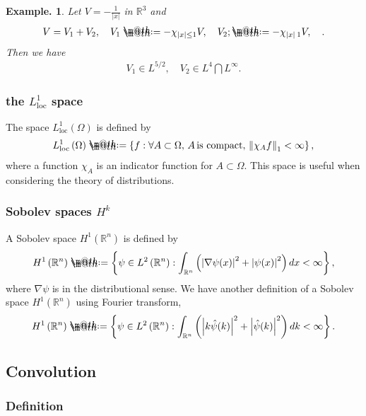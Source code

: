 \documentclass[openany, a4paper, oneside]{book}
\makeatletter
\newcommand*{\defeq}{\mathrel{\rlap{%
\raisebox{0.3ex}{$\m@th\cdot$}}%
\raisebox{-0.3ex}{$\m@th\cdot$}}%
=}
\theoremstyle{break}
\theoremstyle{breakdefn}
\newtheorem{ex}[thm]{Example.}
\newcommand{\abs}[1]{\left|#1\right|}
\newcommand{\norm}[1]{\left\Vert#1\right\Vert}
\newcommand{\rbk}[1]{\left (#1\right)}
\newcommand{\set}[2]{\left\{#1 : #2\right\}}
\newcommand{\bbR}{\mathbb{R}}
\newcommand{\bbRthree}{\mathbb{R}^3}
\newcommand{\bbRn}{\mathbb{R}^n}
\newcommand{\Loneloc}{L_{\mathrm{loc}}^1}
\newcommand{\LtwoRn}{L^2 \rbk{\bbR^n}}
\makeatother
\begin{document}
\begin{ex}
 Let $V = - \frac{1}{\abs{x}}$ in $\bbRthree$ and
 \begin{align}
  V = V_1 + V_2, \quad
  V_1
  \defeq
  -\chi_{\abs{x} \leq 1} V, \quad
  V_2;
  \defeq
  -\chi_{\abs{x} \> 1} V, \quad.
 \end{align}
 Then we have
 \begin{align}
  V_1 \in L^{5/2}, \quad
  V_2 \in L^{4} \bigcap L^{\infty}.
 \end{align}
\end{ex}
\subsubsection{the $\Loneloc$ space}
\label{sec-7-10-2-2-3}

The space $\Loneloc \rbk{\Omega}$ is defined by
\begin{align}
 \Loneloc \rbk{\Omega}
 \defeq
 \set{f}{\forall A \subset \Omega, \, A \, \text{is compact}, \, \norm{\chi_A f}_1 < \infty},
\end{align}
where a function $\chi_A$ is an indicator function for $A \subset \Omega$.
This space is useful when considering the theory of distributions.
\subsubsection{Sobolev spaces $H^k$}
\label{sec-7-10-2-2-4}

A Sobolev space $H^1 (\bbRn)$ is defined by
\begin{align}
 H^1 \rbk{\bbRn}
 \defeq
 \set{\psi \in \LtwoRn}{\int_{\bbRn} \rbk{\abs{\nabla \psi (x)}^2 + \abs{\psi (x)}^2} dx < \infty},
\end{align}
where $\nabla \psi$ is in the distributional sense.
We have another definition of a Sobolev space $H^1 (\bbRn)$ using Fourier transform,
\begin{align}
 H^1 \rbk{\bbRn}
 \defeq
 \set{\psi \in \LtwoRn}{\int_{\bbRn} \rbk{\abs{k \hat{\psi} (k)}^2 + \abs{\hat{\psi} (k)}^2} dk < \infty}.
\end{align}
\subsection{Convolution}
\label{sec-7-10-2-3}
\subsubsection{Definition}
\label{sec-7-10-2-3-1}
\end{document}
